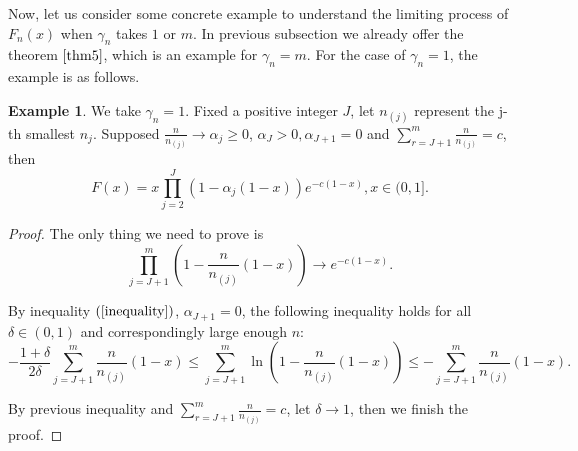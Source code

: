 \documentclass[12pt]{article}
\theoremstyle{plain}
\theoremstyle{definition}
\newtheorem{exm}{\textbf{Example}}
\theoremstyle{remark}
\begin{document}
Now, let us consider some concrete example to understand the limiting process of $F_n(x)$ when $\gamma_{n}$ takes $1$ or $m$. In previous subsection we already offer the theorem $\ref{thm5}$, which is an example for $\gamma_{n}=m$. For the case of $\gamma_{n}=1$, the example is as follows.
\begin{exm}\label{ex4.1}
    We take $\gamma_n=1$. Fixed a positive integer $J$, let $n_{(j)}$ represent the j-th smallest $n_j$. Supposed $\frac{n}{n_{(j)}}\rightarrow \alpha_j \geq 0$, $\alpha _J>0,  \alpha_{J+1}=0$ and $\sum_{r=J+1}^{m} \frac{n}{n_{(j)}}=c$, then
    \begin{equation}
    F(x)=x\prod_{j=2}^{J}\left(1-\alpha_j(1-x)\right)e^{-c(1-x)},x\in (0,1].
    \end{equation}
\end{exm}
\begin{proof}
    The only thing we need to prove is
    \begin{equation*}
        \prod_{j=J+1}^{m}\left(1-\frac{n}{n_{(j)}}(1-x)\right)\rightarrow e^{-c(1-x)}.
    \end{equation*}

    By inequality $(\ref{inequality})$, $ \alpha_{J+1}=0$, the following inequality holds for all $\delta\in (0,1)$ and correspondingly large enough $n$:
    \begin{equation*}
        -\frac{1+\delta}{2 \delta} \sum_{j=J+1}^{m} \frac{ n}{n_{(j)}}(1-x) \leqslant  \sum_{j=J+1}^{m} \ln \left({1-   \frac{n}{n_{(j)}} (1-x)}\right) \leqslant-\sum_{j=J+1}^{m} \frac{n}{n_{(j)}} (1-x).
    \end{equation*}

    By previous inequality and $\sum_{r=J+1}^{m} \frac{n}{n_{(j)}}=c$, let $\delta \rightarrow 1$, then we finish the proof.
\end{proof}
\end{document}
